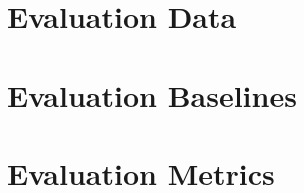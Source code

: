 \documentclass[11pt]{article}
\begin{document}
\section{Evaluation Data}



\section{Evaluation Baselines}


\section{Evaluation Metrics}






\nocite{*}


%
\newpage

%
\end{document}
